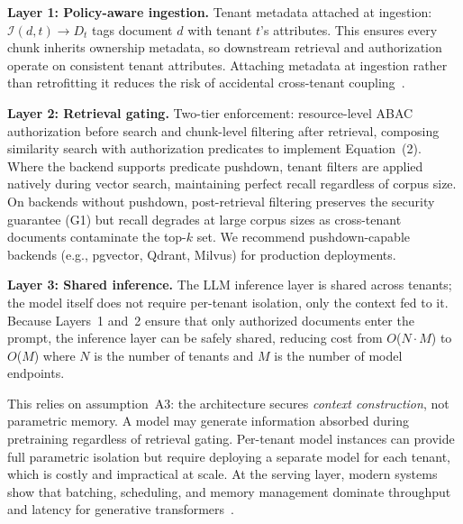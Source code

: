 \documentclass[sigconf]{acmart}
\begin{document}
\textbf{Layer 1: Policy-aware ingestion.} Tenant metadata attached at ingestion: $\mathcal{I}(d, t) \rightarrow D_t$ tags document $d$ with tenant $t$'s attributes. This ensures every chunk inherits ownership metadata, so downstream retrieval and authorization operate on consistent tenant attributes. Attaching metadata at ingestion rather than retrofitting it reduces the risk of accidental cross-tenant coupling~\cite{sculley2015hiddentechnicaldebt}.

\textbf{Layer 2: Retrieval gating.} Two-tier enforcement: resource-level ABAC authorization before search and chunk-level filtering after retrieval, composing similarity search with authorization predicates to implement Equation~(2). Where the backend supports predicate pushdown, tenant filters are applied natively during vector search, maintaining perfect recall regardless of corpus size. On backends without pushdown, post-retrieval filtering preserves the security guarantee (G1) but recall degrades at large corpus sizes as cross-tenant documents contaminate the top-$k$ set. We recommend pushdown-capable backends (e.g., pgvector, Qdrant, Milvus) for production deployments.

\textbf{Layer 3: Shared inference.} The LLM inference layer is shared across tenants; the model itself does not require per-tenant isolation, only the context fed to it. Because Layers~1 and~2 ensure that only authorized documents enter the prompt, the inference layer can be safely shared, reducing cost from $O$($N \cdot M$) to $O$($M$) where $N$ is the number of tenants and $M$ is the number of model endpoints.

This relies on assumption~A3: the architecture secures \emph{context construction}, not parametric memory. A model may generate information absorbed during pretraining regardless of retrieval gating. Per-tenant model instances can provide full parametric isolation but require deploying a separate model for each tenant, which is costly and impractical at scale. At the serving layer, modern systems show that batching, scheduling, and memory management dominate throughput and latency for generative transformers~\cite{yu2022orca,kwon2023vllm}.
\end{document}
